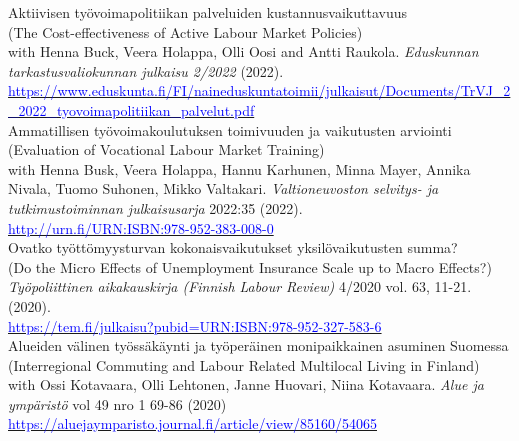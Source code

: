 \documentclass[16pt]{article}
\begin{document}
\noindent Aktiivisen työvoimapolitiikan palveluiden kustannusvaikuttavuus \\
\noindent (The Cost-effectiveness of Active Labour Market Policies) \\
\noindent with Henna Buck, Veera Holappa, Olli Oosi and Antti Raukola. \textit{Eduskunnan tarkastusvaliokunnan julkaisu 2/2022} (2022). \\
\noindent  \href{https://www.eduskunta.fi/FI/naineduskuntatoimii/julkaisut/Documents/TrVJ\_2\_2022\_tyovoimapolitiikan\_palvelut.pdf}{\textcolor{blue}{https://www.eduskunta.fi/FI/naineduskuntatoimii/julkaisut/Documents/TrVJ\_2\_2022\_tyovoimapolitiikan\_palvelut.pdf}} \\

\noindent Ammatillisen ty\"{o}voimakoulutuksen toimivuuden ja vaikutusten arviointi \\
\noindent (Evaluation of Vocational Labour Market Training) \\
\noindent with Henna Busk, Veera Holappa, Hannu Karhunen, Minna Mayer, Annika Nivala, Tuomo Suhonen, Mikko Valtakari.  \textit{Valtioneuvoston selvitys- ja tutkimustoiminnan julkaisusarja} 2022:35 (2022).  \\
\noindent \href{http://urn.fi/URN:ISBN:978-952-383-008-0}{\textcolor{blue}{http://urn.fi/URN:ISBN:978-952-383-008-0}} \\

\noindent Ovatko ty\"{o}tt\"{o}myysturvan kokonaisvaikutukset yksil\"{o}vaikutusten summa? \\
\noindent (Do the Micro Effects of Unemployment Insurance Scale up to Macro Effects?) \\
\noindent  \textit{Ty\"{o}poliittinen aikakauskirja (Finnish Labour Review)} 4/2020 vol. 63, 11-21.  (2020). \\
\noindent  \href{https://tem.fi/julkaisu?pubid=URN:ISBN:978-952-327-583-6} {\textcolor{blue}{https://tem.fi/julkaisu?pubid=URN:ISBN:978-952-327-583-6}}\\

\noindent Alueiden v\"{a}linen ty\"{o}ss\"{a}k\"{a}ynti ja ty\"{o}per\"{a}inen monipaikkainen asuminen Suomessa \\
\noindent (Interregional Commuting and Labour Related Multilocal Living in Finland) \\
\noindent with Ossi Kotavaara, Olli Lehtonen, Janne Huovari, Niina Kotavaara. \textit{Alue ja ympäristö} vol 49 nro 1 69-86 (2020) \\
\noindent  \href{https://aluejaymparisto.journal.fi/article/view/85160/54065}{\textcolor{blue}{https://aluejaymparisto.journal.fi/article/view/85160/54065}} \\
 
\end{document}
